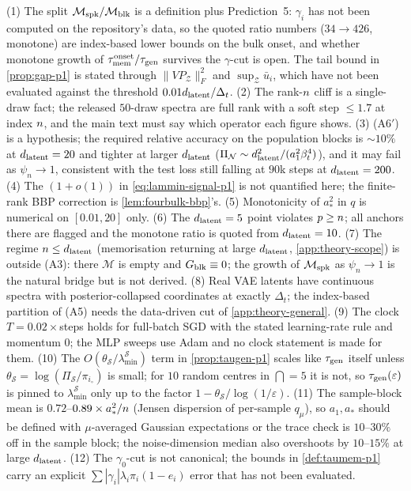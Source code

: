 (1) The split $\mathcal M_{\rm spk}/\mathcal M_{\rm blk}$ is a definition plus Prediction~5: $\gamma_i$ has not been computed on the repository's data, so the quoted ratio numbers ($34\to426$, monotone) are index-based lower bounds on the bulk onset, and whether monotone growth of $\tau_{\mathrm{mem}}^{\rm onset}/\tau_{\mathrm{gen}}$ survives the $\gamma$-cut is open. The tail bound in \cref{prop:gap-p1} is stated through $\|VP_{\mathcal Z}\|_F^2$ and $\sup_{\mathcal Z}\bar u_i$, which have not been evaluated against the threshold $0.01d_{\mathrm{latent}}/\Delta_t$. (2) The rank-$n$ cliff is a single-draw fact; the released $50$-draw spectra are full rank with a soft step $\le1.7$ at index $n$, and the main text must say which operator each figure shows. (3) (A6$'$) is a hypothesis; the required relative accuracy on the population blocks is $\sim10\%$ at $d_{\mathrm{latent}}=20$ and tighter at larger $d_{\mathrm{latent}}$ ($\Pi_{\mathcal N}\sim d_{\mathrm{latent}}^2/(a_1^2\beta_t^4)$), and it may fail as $\psi_n\to1$, consistent with the test loss still falling at $90$k steps at $d_{\mathrm{latent}}=200$. (4) The $(1+o(1))$ in \eqref{eq:lammin-signal-p1} is not quantified here; the finite-rank BBP correction is \cref{lem:fourbulk-bbp}'s. (5) Monotonicity of $a_*^2$ in $q$ is numerical on $[0.01,20]$ only. (6) The $d_{\mathrm{latent}}=5$ point violates $p\ge n$; all anchors there are flagged and the monotone ratio is quoted from $d_{\mathrm{latent}}=10$. (7) The regime $n\le d_{\mathrm{latent}}$ (memorisation returning at large $d_{\mathrm{latent}}$, \cref{app:theory-scope}) is outside (A3): there $\mathcal M$ is empty and $G_{\rm blk}\equiv0$; the growth of $\mathcal M_{\rm spk}$ as $\psi_n\to1$ is the natural bridge but is not derived. (8) Real VAE latents have continuous spectra with posterior-collapsed coordinates at exactly $\Delta_t$; the index-based partition of (A5) needs the data-driven cut of \cref{app:theory-general}. (9) The clock $T=0.02\times$steps holds for full-batch SGD with the stated learning-rate rule and momentum $0$; the MLP sweeps use Adam and no clock statement is made for them. (10) The $O(\theta_{\mathcal S}/\lambda^{\mathcal S}_{\min})$ term in \cref{prop:taugen-p1} scales like $\tau_{\mathrm{gen}}$ itself unless $\theta_{\mathcal S}=\log(\Pi_{\mathcal S}/\pi_{i_\circ})$ is small; for $10$ random centres in $\dint=5$ it is not, so $\tau_{\mathrm{gen}}(\varepsilon)$ is pinned to $\lambda^{\mathcal S}_{\min}$ only up to the factor $1-\theta_{\mathcal S}/\log(1/\varepsilon)$. (11) The sample-block mean is $0.72$--$0.89\times a_*^2/n$ (Jensen dispersion of per-sample $q_\mu$), so $a_1,a_*$ should be defined with $\mu$-averaged Gaussian expectations or the trace check is $10$--$30\%$ off in the sample block; the noise-dimension median also overshoots by $10$--$15\%$ at large $d_{\mathrm{latent}}$. (12) The $\gamma_0$-cut is not canonical; the bounds in \cref{def:taumem-p1} carry an explicit $\sum|\gamma_i|\lambda_i\pi_i(1-e_i)$ error that has not been evaluated.

